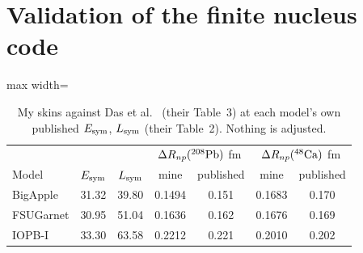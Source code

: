 \documentclass[11pt,a4paper]{article}
\newcommand{\Esym}{E_{\rm sym}}
\newcommand{\Lsym}{L_{\rm sym}}
\newcommand{\DRnp}{\Delta R_{np}}
\begin{document}
\section{Validation of the finite nucleus code}
\begin{table}[h]
\centering
\caption{My skins against Das et al.\ \cite{Das2021} (their Table~3) at each model's own published $\Esym$, $\Lsym$ (their Table~2). Nothing is adjusted.}\label{tab:valid}
\begin{adjustbox}{max width=\linewidth}
\begin{tabular}{lcccccc}
\toprule
 & & & \multicolumn{2}{c}{$\DRnp(^{208}{\rm Pb})$ fm} & \multicolumn{2}{c}{$\DRnp(^{48}{\rm Ca})$ fm}\\
Model & $\Esym$ & $\Lsym$ & mine & published & mine & published\\
\midrule
BigApple & 31.32 & 39.80 & 0.1494 & 0.151 & 0.1683 & 0.170\\
FSUGarnet & 30.95 & 51.04 & 0.1636 & 0.162 & 0.1676 & 0.169\\
IOPB-I & 33.30 & 63.58 & 0.2212 & 0.221 & 0.2010 & 0.202\\
\bottomrule
\end{tabular}
\end{adjustbox}
\end{table}
\end{document}
